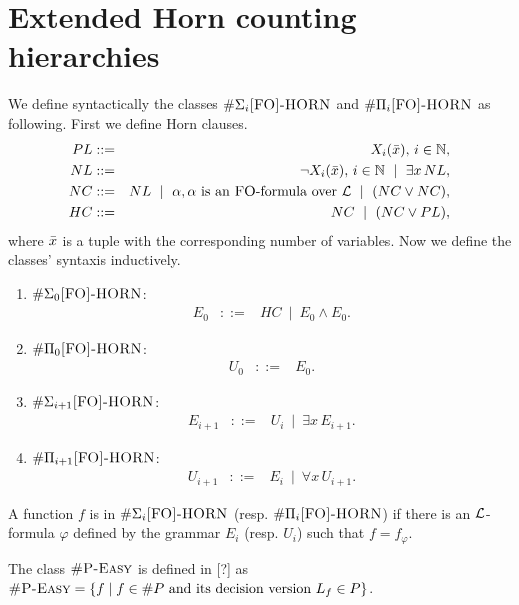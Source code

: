 \section{Extended Horn counting hierarchies}

We define syntactically the classes $\#\Sigma_{i}\textsc{[FO]-HORN}$ and $\#\Pi_{i}\textsc{[FO]-HORN}$ as following. First we define Horn clauses.
\begin{eqnarray*}
PL &::=& X_i(\bar{x}),\, i\in\mathbb{N},\\
NL &::=& \neg X_i(\bar{x}),\, i\in\mathbb{N} \ \mid \ \exists x\, NL,\\
NC &::=& NL \ \mid \ \alpha, \alpha \mbox{ is an {\sc FO}-formula over } {\cal L} \ \mid \ (NC \vee NC),\\
HC &::=& NC \ \mid \ (NC \vee PL),
\end{eqnarray*}
where $\bar{x}$ is a tuple with the corresponding number of variables. Now we define the classes' syntaxis inductively.
\begin{enumerate}
	\item $\#\Sigma_0\textsc{[FO]-HORN}$:
	\begin{eqnarray*}
	E_0 &::=& HC \ \mid \ E_0 \wedge E_0.
	\end{eqnarray*}
	\item $\#\Pi_0\textsc{[FO]-HORN}$:
	\begin{eqnarray*}
	U_0 &::=& E_0.
	\end{eqnarray*}
	\item $\#\Sigma_{i+1}\textsc{[FO]-HORN}$:
	\begin{eqnarray*}
	E_{i+1} &::=& U_i \ \mid \ \exists x \, E_{i+1}.
	\end{eqnarray*}
	\item $\#\Pi_{i+1}\textsc{[FO]-HORN}$:
	\begin{eqnarray*}
		U_{i+1} &::=& E_i \ \mid \ \forall x \, U_{i+1}.
	\end{eqnarray*}
\end{enumerate}
A function $f$ is in $\#\Sigma_{i}\textsc{[FO]-HORN}$ (resp. $\#\Pi_{i}\textsc{[FO]-HORN}$) if there is an ${\cal L}$-formula $\varphi$ defined by the grammar $E_i$ (resp. $U_i$) such that $f = f_{\varphi}$.

The class $\textsc{\#P-Easy}$ is defined in [?] as $\textsc{\#P-Easy} = \{f\mid f\in\#P \mbox{ and its decision version } L_{f}\in P\}$.

